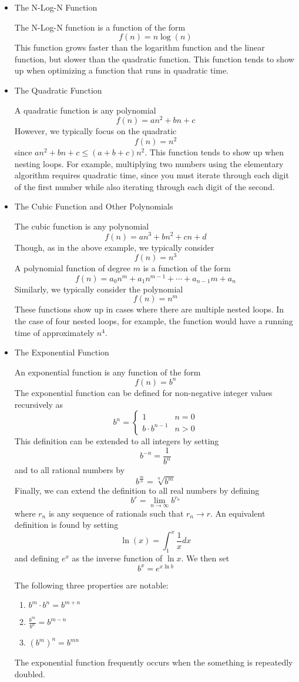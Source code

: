 \documentclass[a4paper]{article}
\begin{document}
\begin{itemize}
  \item The N-Log-N Function
  
  The N-Log-N function is a function of the form \[f(n)=n\log(n)\] This function grows faster than the logarithm function and the linear function, but slower than the quadratic function. This function tends to show up when optimizing a function that runs in quadratic time.
  \item The Quadratic Function
  
  A quadratic function is any polynomial \[f(n) = an^2+bn+c\] However, we typically focus on the quadratic \[f(n) = n^2\] since $an^2+bn+c\leq(a+b+c)n^2$. This function tends to show up when nesting loops. For example, multiplying two numbers using the elementary algorithm requires quadratic time, since you must iterate through each digit of the first number while also iterating through each digit of the second. 
  
  \item The Cubic Function and Other Polynomials
  
  The cubic function is any polynomial \[f(n)=an^3+bn^2+cn+d\] Though, as in the above example, we typically consider \[f(n) = n^3\] A polynomial function of degree $m$ is a function of the form \[f(n)=a_0n^m+a_1n^{m-1}+\cdots+a_{n-1}m+a_n\] Similarly, we typically consider the polynomial \[f(n)=n^m\] These functions show up in cases where there are multiple nested loops. In the case of four nested loops, for example, the function would have a running time of approximately $n^4$.
  
  \item The Exponential Function
  
  An exponential function is any function of the form \[f(n)=b^n\] The exponential function can be defined for non-negative integer values recursively as \[b^n=\begin{cases}1 & n = 0\\b\cdot b^{n-1} & n>0\end{cases}\] This definition can be extended to all integers by setting \[b^{-n}=\frac{1}{b^n}\] and to all rational numbers by \[b^{\frac{m}{n}}=\sqrt[n]{b^m}\] Finally, we can extend the definition to all real numbers by defining \[b^r=\lim_{n\to\infty}b^{r_n}\] where $r_n$ is any sequence of rationals such that $r_n\to r$. An equivalent definition is found by setting \[\ln(x)=\int_1^x\frac{1}{x}dx\] and defining $e^x$ as the inverse function of $\ln{x}$. We then set \[b^x=e^{x\ln{b}}\]
  
  The following three properties are notable:
  \begin{enumerate}
  \item $b^m\cdot b^n=b^{m+n}$
  \item $\frac{b^m}{b^n}=b^{m-n}$
  \item $(b^m)^n=b^{mn}$
  \end{enumerate}
  
The exponential function frequently occurs when the something is repeatedly doubled. 
\end{itemize}
\end{document}
